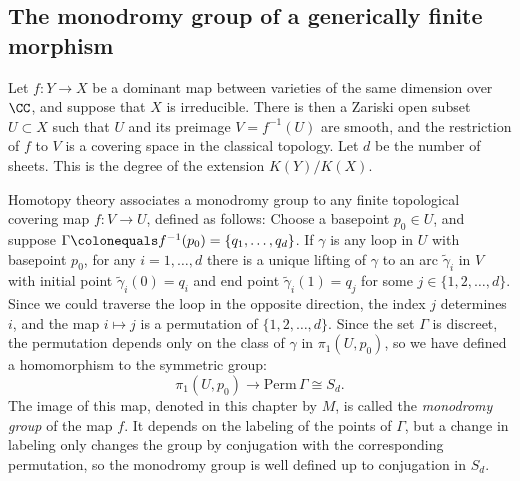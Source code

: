 \subsection*{The monodromy group of a generically finite morphism}

Let $f : Y \to X$ be a 
dominant map between varieties of the same dimension
over $\CC$, and suppose that $X$ is irreducible. There is then
a Zariski open subset $U \subset X$ such that $U$ and
its preimage $V = f^{-1}(U)$ are smooth, and the restriction of $f$
to $V$ is a covering space in the classical topology. Let $d$ be the
%
number of sheets. This is the degree of the extension $K(Y)/K(X)$.

Homotopy theory
%
associates a monodromy group to any finite
topological covering map $f : V \to U$, defined as follows: Choose a
basepoint $p_0 \in U$, and suppose $\Gamma \colonequals  f^{-1}(p_0)  =
\{q_1,\dots,q_d\}$. If $\gamma$ is any loop in $U$ with basepoint $p_0$,
for any $i = 1, \dots, d$ there is a unique lifting of $\gamma$ to an
arc $\tilde \gamma_i$ in $V$ with initial point $\tilde \gamma_i(0)
= q_i$ and end point $\tilde \gamma_i(1) = q_j$ for some $j \in
\{1,2,\dots,d\}$. Since we could traverse the loop in the opposite
direction, the index $j$ determines $i$, and the map $i\mapsto j$ is a
permutation of $\{1,2,\dots,d\}$.
Since the set $\Gamma$ is discreet, the permutation depends only on the
class of $\gamma$ in $\pi_1(U,p_0)$, so we have defined a homomorphism
to the 
symmetric group:
%
$$
\pi_1(U,p_0)  \to \mathrm{ Perm}\,\Gamma \cong S_d.
$$
The image of this map,
 denoted in this chapter by $M$,
is called the \emph{monodromy group} of the
%
map $f$. It depends on the labeling of the points of $\Gamma$, but a
change in labeling
only changes the group by conjugation with the corresponding permutation,
so the monodromy group is well defined up to
conjugation in $S_{d}$.
\vspace*{3pt}

